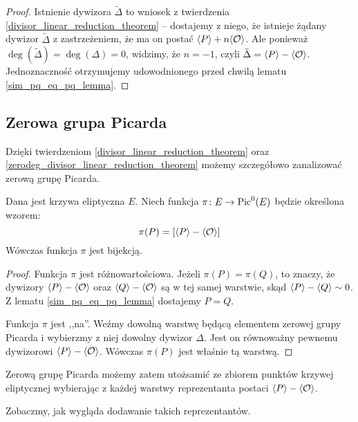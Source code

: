 \begin{proof}
Istnienie dywizora $\tilde{\Delta}$ to wniosek z twierdzenia
\ref{divisor_linear_reduction_theorem} --
dostajemy z niego, że istnieje żądany dywizor $\tilde{\Delta}$
z zastrzeżeniem, że ma on postać $\langle P\rangle + n\langle\mathcal{O}\rangle$.
Ale ponieważ $\deg(\tilde{\Delta}) = \deg(\Delta) = 0$,
widzimy, że $n = -1$, czyli $\tilde{\Delta} = \langle P\rangle - \langle\mathcal{O}\rangle$.
Jednoznaczność otrzymujemy udowodnionego przed chwilą lematu
\ref{sim_pq_eq_pq_lemma}.
\end{proof}

\subsection*{Zerowa grupa Picarda}

Dzięki twierdzeniom \ref{divisor_linear_reduction_theorem}
oraz \ref{zerodeg_divisor_linear_reduction_theorem}
możemy szczegółowo zanalizować zerową grupę Picarda.

\begin{theorem}\label{piczero_curvepts_bijection_theorem}
Dana jest krzywa eliptyczna $E$.
Niech funkcja $\pi\colon E \to \operatorname{Pic}^0(E)$ będzie określona wzorem:
\begin{equation}\label{piczero_bijection_eqn}
\pi(P) = [\langle P\rangle - \langle\mathcal{O}\rangle]
\end{equation}
Wówczas funkcja $\pi$ jest bijekcją.
\end{theorem}

\begin{proof}
Funkcja $\pi$ jest różnowartościowa. Jeżeli $\pi(P) = \pi(Q)$,
to znaczy, że dywizory $\langle P\rangle - \langle\mathcal{O}\rangle$
oraz $\langle Q\rangle - \langle\mathcal{O}\rangle$ są w tej samej warstwie,
skąd $\langle P\rangle - \langle Q\rangle \sim 0$.
Z lematu \ref{sim_pq_eq_pq_lemma} dostajemy $P = Q$.

Funkcja $\pi$ jest ,,na''. Weźmy dowolną warstwę będącą elementem
zerowej grupy Picarda i wybierzmy z niej dowolny dywizor $\Delta$.
Jest on równoważny pewnemu dywizorowi $\langle P\rangle - \langle\mathcal{O}\rangle$.
Wówczas $\pi(P)$ jest właśnie tą warstwą.
\end{proof}

\begin{corollary}\label{piczero_representants_coro}
Zerową grupę Picarda możemy zatem utożsamić
ze zbiorem punktów krzywej eliptycznej
wybierając z każdej warstwy reprezentanta postaci $\langle P\rangle - \langle\mathcal{O}\rangle$.
\end{corollary}

Zobaczmy, jak wygląda dodawanie takich reprezentantów.

